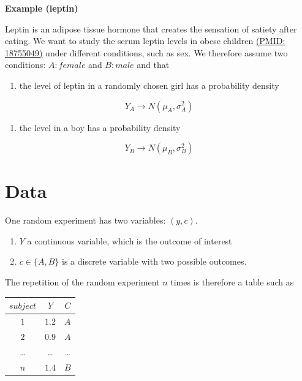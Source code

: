 \documentclass[
]{book}
\providecommand{\tightlist}{%
  \setlength{\itemsep}{0pt}\setlength{\parskip}{0pt}}
\begin{document}
\textbf{Example (leptin)}

Leptin is an adipose tissue hormone that creates the sensation of satiety after eating. We want to study the serum leptin levels in obese children \href{https://pubmed.ncbi.nlm.nih.gov/18755049/}{(PMID: 18755049)} under different conditions, such as sex. We therefore assume two conditions: \(A:female\) and \(B:male\) and that

\begin{enumerate}
\def\labelenumi{\arabic{enumi})}
\tightlist
\item
  the level of leptin in a randomly chosen girl has a probability density
\end{enumerate}

\[Y_A \rightarrow N(\mu_A, \sigma_A^2)\]

\begin{enumerate}
\def\labelenumi{\arabic{enumi})}
\setcounter{enumi}{1}
\tightlist
\item
  the level in a boy has a probability density
\end{enumerate}

\[Y_B \rightarrow N(\mu_B, \sigma_B^2)\]

\hypertarget{data-1}{%
\section{Data}\label{data-1}}

One random experiment has two variables: \((y, c)\).

\begin{enumerate}
\def\labelenumi{\arabic{enumi}.}
\item
  \(Y\) a continuous variable, which is the outcome of interest
\item
  \(c \in \{A,B\}\) is a discrete variable with two possible outcomes.
\end{enumerate}

The repetition of the random experiment \(n\) times is therefore a table such as

\begin{longtable}[]{@{}ccc@{}}
\toprule
\(subject\) & \(Y\) & \(C\) \\
\midrule
\endhead
\(1\) & \(1.2\) & \(A\) \\
\(2\) & \(0.9\) & \(A\) \\
\ldots{} & \ldots{} & \ldots{} \\
\(n\) & \(1.4\) & \(B\) \\
\bottomrule
\end{longtable}
\end{document}
